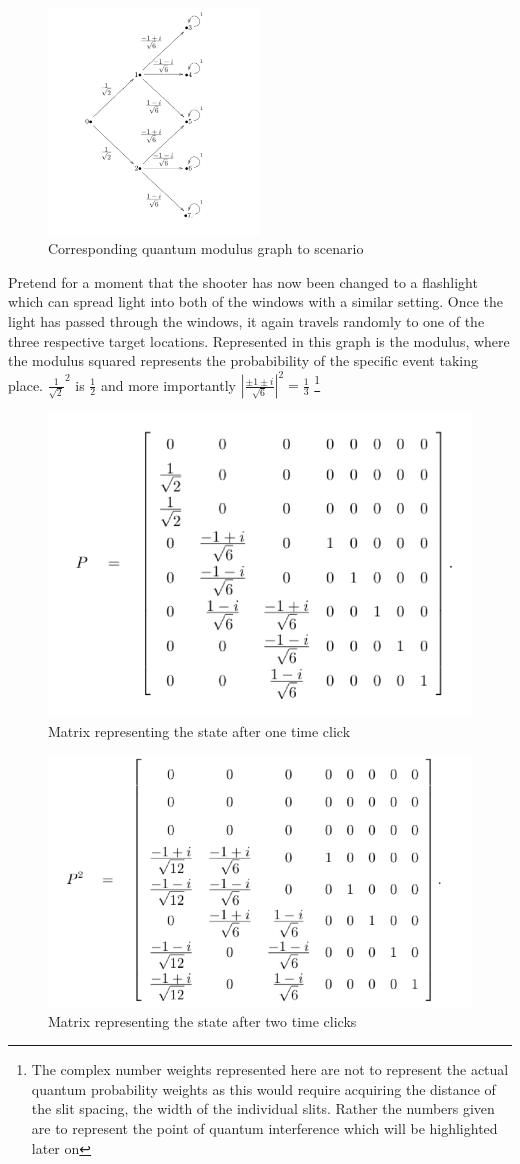 \documentclass[12pt]{article}
\begin{document}
\begin{figure}
    \centering
    \includegraphics[width=0.5\textwidth]{quantumslit}
    \caption{Corresponding quantum modulus graph to scenario}
\end{figure}
Pretend for a moment that the shooter has now been changed to a flashlight which can spread light into both of the windows with a similar setting. Once the light has passed through the windows, it again travels randomly to one of the three respective target locations. Represented in this graph is the modulus, where the modulus squared represents the probabibility of the specific event taking place. $\frac{1}{\sqrt{2}}^2$ is $\frac{1}{2}$ and more importantly $\left|\frac{\pm 1 \pm i }{\sqrt{6}}\right|^2 = \frac{1}{3}$  \footnote{The complex number weights represented here are not to represent the actual quantum probability weights as this would require acquiring the distance of the slit spacing, the width of the individual slits. Rather the numbers given are to represent the point of quantum interference which will be highlighted later on}
\begin{figure}
	\centering
	\caption{Matrix representing the state after one time click}
	\includegraphics[width=.5\textwidth]{quantumP}
\end{figure}
\begin{figure}
	\centering
	\caption{Matrix representing the state after two time clicks}
	\includegraphics[width=.5\textwidth]{quantumP2}
\end{figure}
\end{document}
